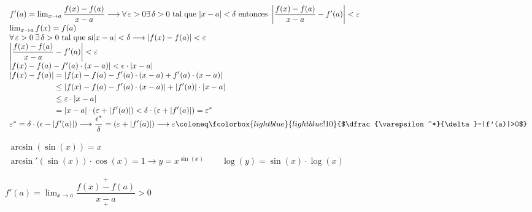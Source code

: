 \documentclass[12pt]{article}
\newcommand{\bboxed}[1]{\fcolorbox{lightblue}{lightblue!10}{$#1$}}
\begin{document}
$\begin{array}{l}
	f'(a)=\lim_{x\to a}\dfrac{f(x)-f(a)}{x-a}\longrightarrow\forall\,\varepsilon>0\exists\,\delta>0\text{ tal que }|x-a|<\delta\text{ entonces }\left|\dfrac{f(x)-f(a)}{x-a}-f'(a)\right|<\varepsilon\\
	\lim_{x\to a}f(x)=f(a)\\
	\forall\,\varepsilon>0\:\exists\,\delta>0\text{ tal que si}|x-a|<\delta\longrightarrow|f(x)-f(a)|<\varepsilon\\
	\left|\dfrac{f(x)-f(a)}{x-a}-f'(a)\right|<\varepsilon\\
	|f(x)-f(a)-f'(a)\cdot(x-a)|<\epsilon\cdot|x-a|\\
	\begin{aligned}
		|f(x)-f(a)|&=|f(x)-f(a)-f'(a)\cdot(x-a)+f'(a)\cdot(x-a)|\\
		&\le|f(x)-f(a)-f'(a)\cdot(x-a)|+|f'(a)|\cdot|x-a|\\
		&\le\varepsilon\cdot|x-a|\\
		&=|x-a|\cdot\left(\varepsilon+|f'(a)|\right)<\delta\cdot\left(\varepsilon+|f'(a)|\right)=\varepsilon^*
	\end{aligned}\\
	\varepsilon^*=\delta\cdot(\epsilon-|f'(a)|)\longrightarrow\dfrac{\epsilon^*}{\delta}=\left(\varepsilon+|f'(a)|\right)\longrightarrow\varepsilon\coloneq\bboxed{\dfrac{\varepsilon^*}{\delta}-|f'(a)|>0}
\end{array}$
\begin{center}
\end{center}
$\begin{array}{l}
	\arcsin\left(\sin(x)\right)=x\\
	\arcsin'(\sin(x))\cdot\cos(x)=1\longrightarrow y=x^{\sin(x)}\qquad\log(y)=\sin(x)\cdot\log(x)
\end{array}$

$f'(a)=\lim_{x\to a}\dfrac{\overset{+}{f(x)-f(a)}}{\underset{+}{x-a}}>0$
\end{document}
